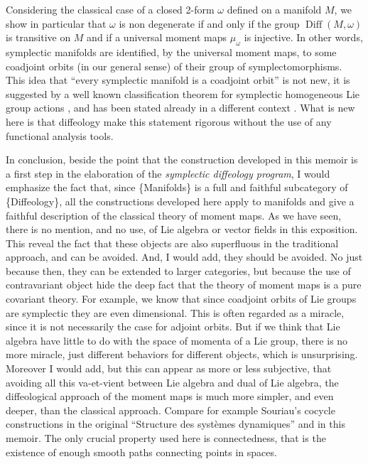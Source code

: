 \documentclass[10pt,reqno,twoside]{amsart}
\DeclareMathOperator{\Diff}{Diff}
\theoremstyle{plain}
\theoremstyle{definition}
\begin{document}
  Considering the classical case of a closed 2-form $\omega$ defined on a manifold $M$,
  we show in particular that $\omega$ is non degenerate if and only if the group $\Diff(M,\omega)$ is transitive on $M$ and if a universal moment maps $\mu_\omega$ is injective.
  In other words,
  symplectic manifolds are identified,
  by the universal moment maps,
  to some coadjoint orbits (in our general sense) of their group of symplectomorphisms.
  This idea that ``every symplectic manifold is a coadjoint orbit'' is not new,
  it is suggested by a well known classification theorem for symplectic homogeneous Lie group actions \cite{Kir74} \cite{Kos70} \cite{Sou70},
  and has been stated already in a different context \cite{Omo86}.
  What is new here is that diffeology make this statement rigorous without the use of any functional analysis tools.
  
  In conclusion,
  beside the point that the construction developed in this memoir is a first step in the elaboration of the {\em symplectic diffeology program\/},
  I would emphasize the fact that,
  since \{Manifolds\} is a full and faithful subcategory of \{Diffeology\},
  all the constructions developed here apply to manifolds and give a faithful description of the classical theory of moment maps.
  As we have seen,
  there is no mention,
  and no use,
  of Lie algebra or vector fields in this exposition.
  This reveal the fact that these objects are also superfluous in the traditional approach,
  and can be avoided.
  And,
  I would add,
  they should be avoided.
  No just because then,
  they can be extended to larger categories,
  but because the use of contravariant object hide the deep fact that the theory of moment maps is a pure covariant theory.
  For example,
  we know that since coadjoint orbits of Lie groups are symplectic they are even dimensional.
  This is often regarded as a miracle,
  since it is not necessarily the case for adjoint orbits.
  But if we think that Lie algebra have little to do with the space of momenta of a Lie group,
  there is no more miracle,
  just different behaviors for different objects,
  which is unsurprising.
  Moreover I would add,
  but this can appear as more or less subjective,
  that avoiding all this va-et-vient between Lie algebra and dual of Lie algebra,
  the diffeological approach of the moment maps is much more simpler,
  and even deeper,
  than the classical approach.
  Compare for example Souriau's cocycle constructions in the original ``Structure des syst\`emes dynamiques'' \cite{Sou70} and in this memoir.
  The only crucial property used here is connectedness,
  that is the existence of enough smooth paths connecting points in spaces.
  
\end{document}
